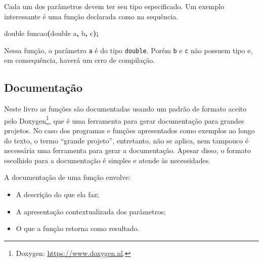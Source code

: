 \documentclass[
  11pt,
  a4paper,
]{scrbook}
\newenvironment{Shaded}{\begin{snugshade}}{\end{snugshade}}
\newcommand{\DataTypeTok}[1]{\textcolor[rgb]{0.13,0.29,0.53}{#1}}
\newcommand{\NormalTok}[1]{#1}
\newcommand{\OperatorTok}[1]{\textcolor[rgb]{0.81,0.36,0.00}{\textbf{#1}}}
\providecommand{\tightlist}{%
  \setlength{\itemsep}{0pt}\setlength{\parskip}{0pt}}\usepackage{longtable,booktabs,array}
\begin{document}
\begin{tcolorbox}[enhanced jigsaw, arc=.35mm, bottomtitle=1mm, colbacktitle=quarto-callout-caution-color!10!white, title=\textcolor{quarto-callout-caution-color}{\faFire}\hspace{0.5em}{Cuidado}, toprule=.15mm, left=2mm, opacityback=0, colback=white, colframe=quarto-callout-caution-color-frame, opacitybacktitle=0.6, bottomrule=.15mm, leftrule=.75mm, toptitle=1mm, coltitle=black, titlerule=0mm, rightrule=.15mm, breakable]

Cada um dos parâmetros devem ter seu tipo especificado. Um exemplo
interessante é uma função declarada como na sequência.

\begin{Shaded}
\begin{Highlighting}[]
\DataTypeTok{double}\NormalTok{ funcao}\OperatorTok{(}\DataTypeTok{double}\NormalTok{ a}\OperatorTok{,}\NormalTok{ b}\OperatorTok{,}\NormalTok{ c}\OperatorTok{);}
\end{Highlighting}
\end{Shaded}

Nessa função, o parâmetro \texttt{a} é do tipo \texttt{double}. Porém
\texttt{b} e \texttt{c} não possuem tipo e, em consequência, haverá um
erro de compilação.

\end{tcolorbox}

\subsection{Documentação}\label{sec-documentacao-funcoes}

Neste livro as funções são documentadas usando um padrão de formato
aceito pelo Doxygen\footnote{Doxygen: \url{https://www.doxygen.nl}.},
que é uma ferramenta para gerar documentação para grandes projetos. No
caso dos programas e funções apresentados como exemplos ao longo do
texto, o termo ``grande projeto'', entretanto, não se aplica, nem
tampouco é necessária uma ferramenta para gerar a documentação. Apesar
disso, o formato escolhido para a documentação é simples e atende às
necessidades.

A documentação de uma função envolve:

\begin{itemize}
\tightlist
\item
  A descrição do que ela faz;
\item
  A apresentação contextualizada dos parâmetros;
\item
  O que a função retorna como resultado.
\end{itemize}
\end{document}
